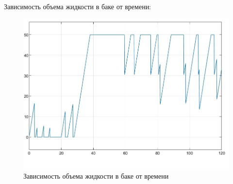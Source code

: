 \documentclass{article}
\begin{document}
	Зависимость объема жидкости в баке от времени:
	\begin{figure}[H]
		\centering
		\includegraphics[width=0.7\linewidth]{Graph_2}
		\caption{Зависимость объема жидкости в баке от времени}
	\end{figure}
	
	
\end{document}
